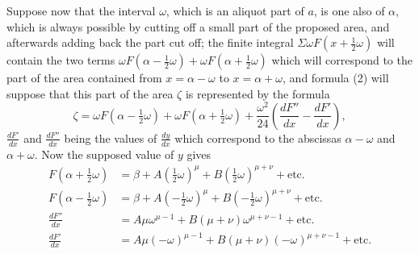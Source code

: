 \documentclass{article}
\begin{document}
Suppose now that the interval $\omega$, which is an aliquot part of $a$, is one also of $\alpha$, which is always possible by cutting off a small part of the proposed area, and afterwards adding back the part cut off; the finite integral $\Sigma\omega F(x+\frac{1}{2}\omega)$ will contain the two terms $\omega F(\alpha-\frac{1}{2}\omega)+\omega F(\alpha+\frac{1}{2}\omega)$ which will correspond to the part of the area contained from $x=\alpha-\omega$ to $x=\alpha+\omega$, and formula (2) will suppose that this part of the area $\zeta$ is represented by the formula
\[ \zeta=\omega F(\alpha-\tfrac{1}{2}\omega)+\omega F(\alpha+\tfrac{1}{2}\omega)+\frac{\omega^{2}}{24}\left(\frac{dF''}{dx}-\frac{dF'}{dx}\right), \]
$\frac{dF'}{dx}$ and $\frac{dF''}{dx}$ being the values of $\frac{dy}{dx}$ which correspond to the abscissas $\alpha-\omega$ and $\alpha+\omega$. Now the supposed value of $y$ gives
\[ \begin{aligned} F(\alpha+\tfrac{1}{2}\omega)&=\beta+A(\tfrac{1}{2}\omega)^{\mu}+B(\tfrac{1}{2}\omega)^{\mu+\nu}+\text{etc.}\\ F(\alpha-\tfrac{1}{2}\omega)&=\beta+A(-\tfrac{1}{2}\omega)^{\mu}+B(-\tfrac{1}{2}\omega)^{\mu+\nu}+\text{etc.}\\ \frac{dF''}{dx}&=A\mu\omega^{\mu-1}+B(\mu+\nu)\omega^{\mu+\nu-1}+\text{etc.}\\ \frac{dF'}{dx}&=A\mu(-\omega)^{\mu-1}+B(\mu+\nu)(-\omega)^{\mu+\nu-1}+\text{etc.} \end{aligned} \]
\end{document}
